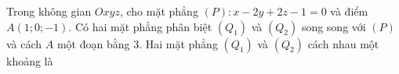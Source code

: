 \begin{ex}
Trong không gian $Oxyz$, cho mặt phẳng $(P)\colon x-2y+2z-1=0$ và điểm $A(1;0;-1)$. Có hai mặt phẳng phân biệt $(Q_1)$ và $(Q_2)$ song song với $(P)$ và cách $A$ một đoạn bằng $3$. Hai mặt phẳng $(Q_1)$ và $(Q_2)$ cách nhau một khoảng là
\end{ex}
